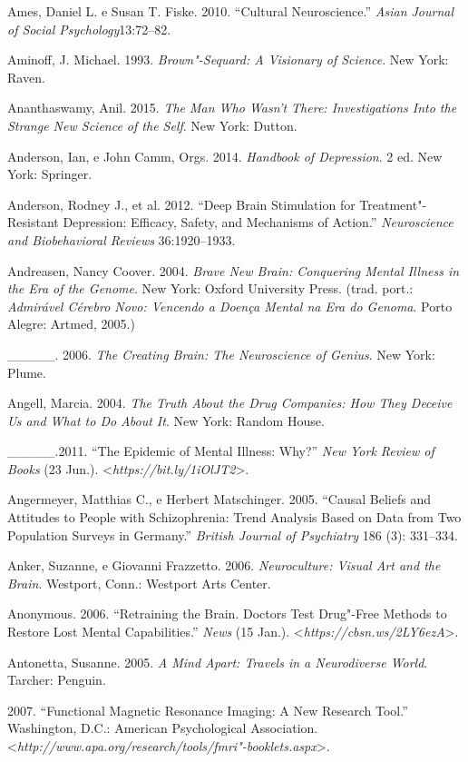 {\begin{Parskip}
Ames, Daniel L. e Susan T. Fiske. 2010. ``Cultural Neuroscience.''
\emph{Asian Journal of Social Psychology}13:72--82.

Aminoff, J. Michael. 1993. \emph{Brown"-Sequard: A Visionary of Science}.
New York: Raven.

Ananthaswamy, Anil. 2015. \emph{The Man Who Wasn't There: Investigations
Into the Strange New Science of the Self}. New York: Dutton.

Anderson, Ian, e John Camm, Orgs. 2014. \emph{Handbook of Depression}. 2
ed. New York: Springer.

Anderson, Rodney J., et al. 2012. ``Deep Brain Stimulation for
Treatment"-Resistant Depression: Efficacy, Safety, and Mechanisms of
Action.'' \emph{Neuroscience and Biobehavioral Reviews} 36:1920--1933.

Andreasen, Nancy Coover. 2004. \emph{Brave New Brain: Conquering Mental
Illness in the Era of the Genome}. New York: Oxford University Press.
(trad. port.: \emph{Admirável Cérebro Novo: Vencendo a Doença Mental na
Era do Genoma}. Porto Alegre: Artmed, 2005.)

\_\_\_\_\_. 2006. \emph{The Creating Brain: The Neuroscience of Genius}.
New York: Plume.

Angell, Marcia. 2004. \emph{The Truth About the Drug Companies: How They
Deceive Us and What to Do About It}. New York: Random House.

\_\_\_\_\_.2011. ``The Epidemic of Mental Illness: Why?'' \emph{New York
Review of Books} (23 Jun.).
\textless{}\emph{https://bit.ly/1iOlJT2}\textgreater{}.

Angermeyer, Matthias C., e Herbert Matschinger. 2005. ``Causal Beliefs
and Attitudes to People with Schizophrenia: Trend Analysis Based on Data
from Two Population Surveys in Germany.'' \emph{British Journal of
Psychiatry} 186 (3): 331--334.

Anker, Suzanne, e Giovanni Frazzetto. 2006. \emph{Neuroculture: Visual
Art and the Brain}. Westport, Conn.: Westport Arts Center.

Anonymous. 2006. ``Retraining the Brain. Doctors Test Drug"-Free Methods
to Restore Lost Mental Capabilities.'' \emph{ News} (15 Jan.).
\textless{}\emph{https://cbsn.ws/2LY6ezA}\textgreater{}.

Antonetta, Susanne. 2005. \emph{A Mind Apart: Travels in a Neurodiverse
World}. Tarcher: Penguin.

 2007. ``Functional Magnetic Resonance Imaging: A New Research
Tool.'' Washington, D.C.: American Psychological Association.
\textless{}\emph{http://www.apa.org/research/tools/fmri"-booklets.aspx}\textgreater{}.


\end{Parskip}}
